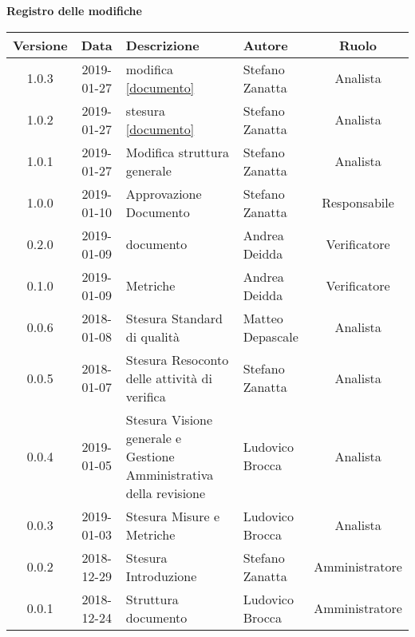 	\begin{center}
		\textbf{Registro delle modifiche}
	\end{center}
	\begin{center}
		\begin{tabularx}{\textwidth}{|c|c|X|X|c|}
			\hline
			\textbf{Versione} & \textbf{Data} & \textbf{Descrizione} & \textbf{Autore} & \textbf{Ruolo} \\
			\hline
			1.0.3 & 2019-01-27 & modifica \ref{documento}& Stefano Zanatta & Analista\\
			\hline
			1.0.2 & 2019-01-27 & stesura \ref{documento}& Stefano Zanatta & Analista\\
			\hline
			1.0.1 & 2019-01-27 & Modifica struttura generale& Stefano Zanatta & Analista\\
			\hline
			1.0.0 & 2019-01-10 & Approvazione Documento& Stefano Zanatta & Responsabile\\
			\hline
			0.2.0 & 2019-01-09 & \glossario{Verifica} documento & Andrea Deidda & Verificatore\\
			\hline
			0.1.0 & 2019-01-09 & \glossario{Verifica} Metriche & Andrea Deidda & Verificatore\\
			\hline
			0.0.6 & 2018-01-08 & Stesura Standard di qualità & Matteo Depascale & Analista\\
			\hline
			0.0.5 & 2018-01-07 & Stesura Resoconto delle attività di verifica & Stefano Zanatta & Analista\\
			\hline
			0.0.4 & 2019-01-05 & Stesura Visione generale e Gestione Amministrativa della revisione  & Ludovico Brocca& Analista\\
			\hline	
			0.0.3 & 2019-01-03& Stesura Misure e Metriche &Ludovico Brocca & Analista\\
			\hline
			0.0.2 & 2018-12-29 & Stesura Introduzione & Stefano Zanatta & Amministratore\\
			\hline
			0.0.1 & 2018-12-24 & Struttura documento & Ludovico Brocca & Amministratore\\
			\hline
		\end{tabularx}
	\end{center}
\newpage